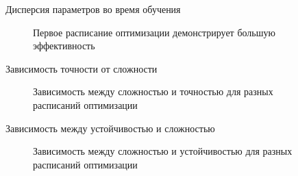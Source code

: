 \documentclass[9pt,pdf,hyperref={unicode}]{beamer}
\begin{document}
\begin{frame}{Дисперсия параметров во время обучения}
\begin{figure}[h!]
\caption{Первое расписание оптимизации демонстрирует большую эффективность}
\label{fig:opt schedule 2}
\end{figure}
\end{frame}
\begin{frame}{Зависимость точности от сложности}
\begin{figure}[h!]
\caption{Зависимость между сложностью и точностью для разных расписаний оптимизации}
\label{fig:opt schedule 2}
\end{figure}
\end{frame}
\begin{frame}{Зависимость между устойчивостью и сложностью}
\begin{figure}[h!]
\caption{Зависимость между сложностью и устойчивостью для разных расписаний оптимизации}
\label{fig:opt schedule 2}
\end{figure}
\end{frame}
\end{document}
